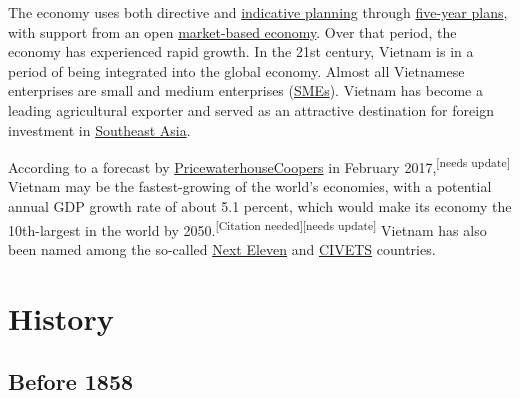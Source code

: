 \documentclass[openany]{book}
\begin{document}
The economy uses both directive and \href{https://en.wikipedia.org/wiki/Indicative_planning}{indicative planning} through \href{https://en.wikipedia.org/wiki/Five-Year_Plans_of_Vietnam}{five-year plans}, with support from an open \href{https://en.wikipedia.org/wiki/Market_economy}{market-based economy}. Over that period, the economy has experienced rapid growth. In the 21st century, Vietnam is in a period of being integrated into the global economy. Almost all Vietnamese enterprises are small and medium enterprises (\href{https://en.wikipedia.org/wiki/Small_and_medium_enterprises}{SMEs}). Vietnam has become a leading agricultural exporter and served as an attractive destination for foreign investment in \href{https://en.wikipedia.org/wiki/Southeast_Asia}{Southeast Asia}.

According to a forecast by \href{https://en.wikipedia.org/wiki/PricewaterhouseCoopers}{PricewaterhouseCoopers} in February 2017,\textsuperscript{[needs update]} Vietnam may be the fastest-growing of the world's economies, with a potential annual GDP growth rate of about 5.1 percent, which would make its economy the 10th-largest in the world by 2050.\textsuperscript{[Citation needed][needs update]} Vietnam has also been named among the so-called \href{https://en.wikipedia.org/wiki/Jim_O%27Neill,_Baron_O%27Neill_of_Gatley#Next_Eleven}{Next Eleven} and \href{https://en.wikipedia.org/wiki/CIVETS}{CIVETS} countries.

\chapter{History}
\section{Before 1858}
\end{document}
